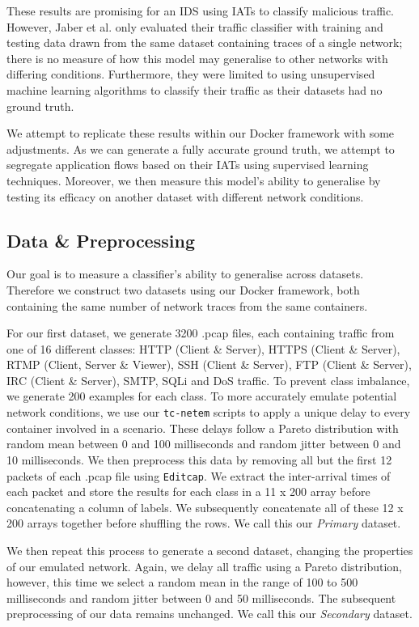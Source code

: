 \documentclass[msc,deptreport, cs]{infthesis} %
\begin{document}
These results are promising for an IDS using IATs to classify malicious traffic. However, Jaber et al. only evaluated their traffic classifier with training and testing data drawn from the same dataset containing traces of a single network; there is no measure of how this model may generalise to other networks with differing conditions. Furthermore, they were limited to using unsupervised machine learning algorithms to classify their traffic as their datasets had no ground truth. 

We attempt to replicate these results within our Docker framework with some adjustments. As we can generate a fully accurate ground truth, we attempt to segregate application flows based on their IATs using supervised learning techniques. Moreover, we then measure this model's ability to generalise by testing its efficacy on another dataset with different network conditions.

\subsection{Data \& Preprocessing}

Our goal is to measure a classifier's ability to generalise across datasets. Therefore we construct two datasets using our Docker framework, both containing the same number of network traces from the same containers. 

For our first dataset, we generate 3200 .pcap files, each containing traffic from one of 16 different classes: HTTP (Client \& Server), HTTPS (Client \& Server), RTMP (Client, Server \& Viewer), SSH (Client \& Server), FTP (Client \& Server), IRC (Client \& Server), SMTP, SQLi and DoS traffic. To prevent class imbalance, we generate 200 examples for each class. To more accurately emulate potential network conditions, we use our \texttt{tc-netem} scripts to apply a unique delay to every container involved in a scenario. These delays follow a Pareto distribution with random mean between 0 and 100 milliseconds and random jitter between 0 and 10 milliseconds. We then preprocess this data by removing all but the first 12 packets of each .pcap file using \texttt{Editcap}. We extract the inter-arrival times of each packet and store the results for each class in a 11 x 200 array before concatenating a column of labels. We subsequently concatenate all of these 12 x 200 arrays together before shuffling the rows. We call this our \textit{Primary} dataset.

We then repeat this process to generate a second dataset, changing the properties of our emulated network. Again, we delay all traffic using a Pareto distribution, however, this time we select a random mean in the range of 100 to 500 milliseconds and random jitter between 0 and 50 milliseconds. The subsequent preprocessing of our data remains unchanged. We call this our \textit{Secondary} dataset.
\end{document}
